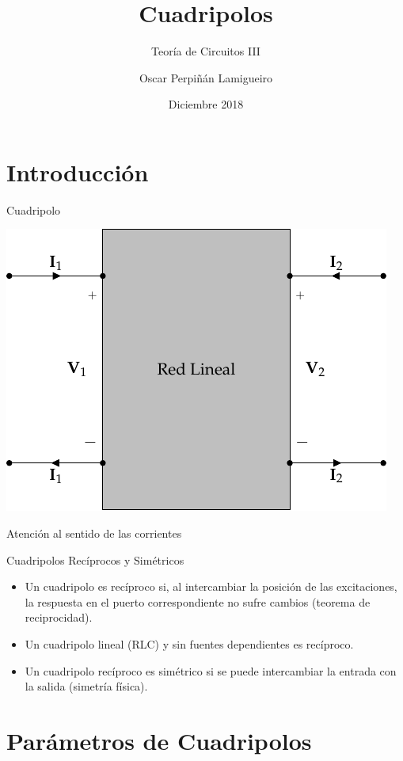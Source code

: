 \documentclass[xcolor={usenames,svgnames,dvipsnames}]{beamer}
\author{Oscar Perpiñán Lamigueiro}
\date{Diciembre 2018}
\title{Cuadripolos}
\subtitle{Teoría de Circuitos III}
\begin{document}
\maketitle

\section{Introducción}
\label{sec:org126df39}

\begin{frame}[label={sec:org4b549c6}]{Cuadripolo}
\begin{center}
\includegraphics[width=.9\linewidth]{figs/cuadripolo.pdf}
\end{center}

\begin{center}
\alert{Atención al sentido de las corrientes}
\end{center}
\end{frame}
\begin{frame}[label={sec:org3661f0f}]{Cuadripolos Recíprocos y Simétricos}
\begin{itemize}
\item Un cuadripolo es \alert{recíproco} si, al intercambiar la posición de las excitaciones, la respuesta en el puerto correspondiente no sufre cambios (teorema de reciprocidad).
\item Un cuadripolo lineal (RLC) y \alert{sin fuentes dependientes} es recíproco.
\item Un \alert{cuadripolo recíproco es simétrico} si se puede intercambiar la entrada con la salida (simetría física).
\end{itemize}
\end{frame}
\section{Parámetros de Cuadripolos}
\label{sec:orgb72d75d}
\end{document}
